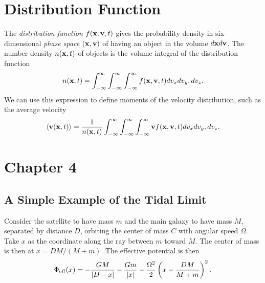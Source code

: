\documentclass[]{article}
\begin{document}
\section{Distribution Function}

The {\it distribution function} $f(\mathbf{x},\mathbf{v},t)$ gives the probability density
in six-dimensional {\it phase space} $(\mathbf{x},\mathbf{v})$ of having an object
in the volume $d\mathbf{x} d\mathbf{v}$.  The number density $n(\mathbf{x},t)$ of objects is the
volume integral of the distribution function
\begin{equation}
n(\mathbf{x},t) = \int_{-\infty}^{\infty}\int_{-\infty}^{\infty}\int_{-\infty}^{\infty} f(\mathbf{x},\mathbf{v},t) dv_{x}dv_y,dv_z.
\end{equation}
\noindent
We can use this expression to define moments of the velocity distribution, such as
the average velocity 
\begin{equation}
\langle\mathbf{v}(\mathbf{x},t)\rangle = \frac{1}{n(\mathbf{x},t)} \int_{-\infty}^{\infty}\int_{-\infty}^{\infty}\int_{-\infty}^{\infty} \mathbf{v} f(\mathbf{x},\mathbf{v},t) dv_{x}dv_y,dv_z.
\end{equation}


\section{Chapter 4}

\subsection{A Simple Example of the Tidal Limit}

Consider the satellite to have mass $m$ and the main galaxy to have mass $M$, separated by distance $D$,
orbiting the center of mass $C$ with angular speed $\Omega$.  Take $x$ as the coordinate
along the ray between $m$ toward $M$.  The center of mass is then at $x=DM/(M+m)$.  The
effective potential is then
\begin{equation}
\Phi_\mathrm{eff}(x) = -\frac{GM}{|D-x|} -\frac{Gm}{|x|} - \frac{\Omega^2}{2}\left(x-\frac{DM}{M+m}\right)^2.
\end{equation}
\end{document}
